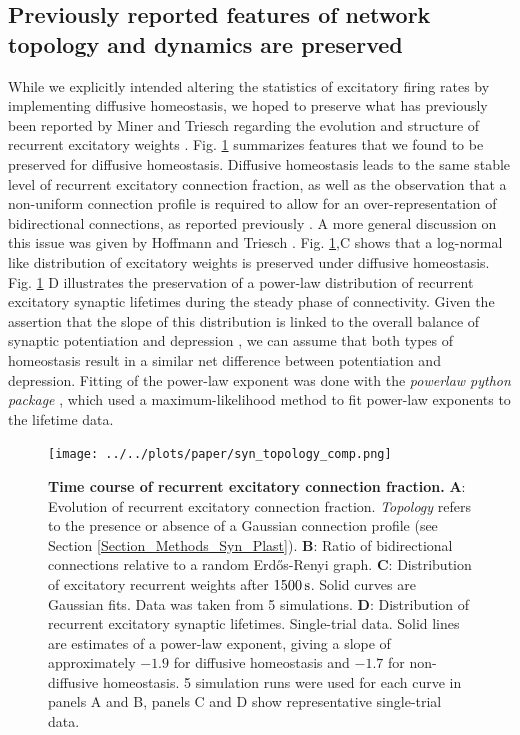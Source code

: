 \documentclass[10pt,letterpaper]{article}
\begin{document}
\subsection*{Previously reported features of network topology and dynamics are preserved}\label{Section_Topol_Preservation}
While we explicitly intended altering the statistics of excitatory firing rates by implementing diffusive homeostasis, we hoped to preserve what has previously been reported by Miner and Triesch regarding the evolution and structure of recurrent excitatory weights \cite{SORN_Paper}. Fig. \ref{Syn_Topology_Features} summarizes features that we found to be preserved for diffusive homeostasis. Diffusive homeostasis leads to the same stable level of recurrent excitatory connection fraction, as well as the observation that a non-uniform connection profile is required to allow for an over-representation of bidirectional connections, as reported previously \cite{SORN_Paper}. A more general discussion on this issue was given by Hoffmann and Triesch \cite{Hoffmann_2017}. Fig. \ref{Syn_Topology_Features},C shows that a log-normal like distribution of excitatory weights is preserved under diffusive homeostasis. Fig. \ref{Syn_Topology_Features} D illustrates the preservation of a power-law distribution of recurrent excitatory synaptic lifetimes during the steady phase of connectivity. Given the assertion that the slope of this distribution is linked to the overall balance of synaptic potentiation and depression \cite{SORN_Paper}, we can assume that both types of homeostasis result in a similar net difference between potentiation and depression. Fitting of the power-law exponent was done with the \textit{powerlaw python package} \cite{Powerlaw_Package}, which used a maximum-likelihood method to fit power-law exponents to the lifetime data.
\begin{figure}
\begin{center}
\texttt{[image: ../../plots/paper/syn\_topology\_comp.png]}
\end{center}
\caption{{\bf Time course of recurrent excitatory connection fraction.} \textbf{A}: Evolution of recurrent excitatory connection fraction. \textit{Topology} refers to the presence or absence of a Gaussian connection profile (see Section \ref{Section_Methods_Syn_Plast}). \textbf{B}: Ratio of bidirectional connections relative to a random Erd\H{o}s-Renyi graph. \textbf{C}: Distribution of excitatory recurrent weights after $\rm 1500\, s$. Solid curves are Gaussian fits. Data was taken from 5 simulations. \textbf{D}: Distribution of recurrent excitatory synaptic lifetimes. Single-trial data. Solid lines are estimates of a power-law exponent, giving a slope of approximately $\mathrm{-1.9}$ for diffusive homeostasis and $\mathrm{-1.7}$ for non-diffusive homeostasis. 5 simulation runs were used for each curve in panels A and B, panels C and D show representative single-trial data.}
\label{Syn_Topology_Features}
\end{figure}
\end{document}
